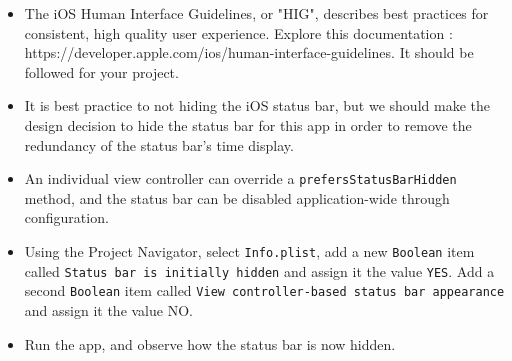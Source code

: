 \documentclass[a4paper,11pt]{scrartcl}
\begin{document}
\begin{itemize}
\item The iOS Human Interface Guidelines, or "HIG", describes best practices for consistent, high quality user experience. Explore this documentation : https://developer.apple.com/ios/human-interface-guidelines. It should be followed for your project.
\item It is best practice to not hiding the iOS status bar, but we should make the design decision to hide the status bar for this app in order to remove the redundancy of the status bar's time display.
\item An individual view controller can override a \texttt{prefersStatusBarHidden} method, and the status bar can be disabled application-wide through configuration.
\item Using the Project Navigator, select \texttt{Info.plist}, add a new \texttt{Boolean} item called \texttt{Status bar is initially hidden} and assign it the value \texttt{YES}. Add a second \texttt{Boolean} item called \texttt{View controller-based status bar appearance} and assign it the value NO.
\item Run the app, and observe how the status bar is now hidden.
\end{itemize}
\end{document}

